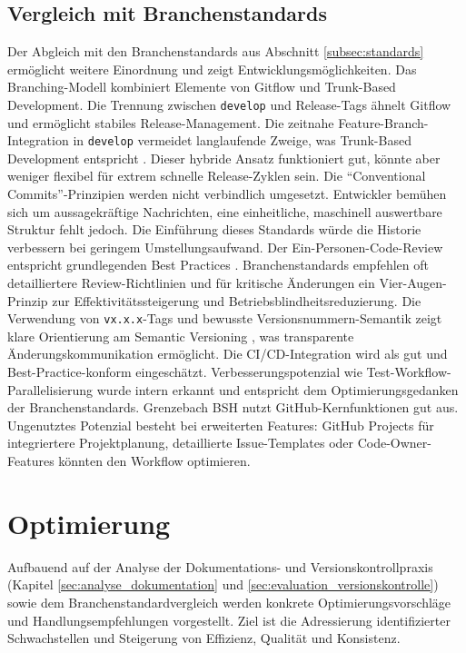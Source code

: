 \documentclass[12pt,oneside]{article}
\begin{document}
    \subsection{Vergleich mit Branchenstandards}
    \label{subsec:vergleich_vk}
    Der Abgleich mit den Branchenstandards aus Abschnitt \ref{subsec:standards} ermöglicht weitere Einordnung und zeigt Entwicklungsmöglichkeiten.
    \newline
    Das Branching-Modell kombiniert Elemente von Gitflow und Trunk-Based Development. Die Trennung zwischen \texttt{develop} und Release-Tags ähnelt Gitflow und ermöglicht stabiles Release-Management. Die zeitnahe Feature-Branch-Integration in \texttt{develop} vermeidet langlaufende Zweige, was Trunk-Based Development entspricht \cite{AtlassianGitWorkflows}. Dieser hybride Ansatz funktioniert gut, könnte aber weniger flexibel für extrem schnelle Release-Zyklen sein.
    \newline
    Die ``Conventional Commits''-Prinzipien \cite{ConventionalCommitsOrgDe} werden nicht verbindlich umgesetzt. Entwickler bemühen sich um aussagekräftige Nachrichten, eine einheitliche, maschinell auswertbare Struktur fehlt jedoch. Die Einführung dieses Standards würde die Historie verbessern bei geringem Umstellungsaufwand.
    \newline
    Der Ein-Personen-Code-Review entspricht grundlegenden Best Practices \cite{AtlassianWasIstEinPullRequest}. Branchenstandards empfehlen oft detailliertere Review-Richtlinien und für kritische Änderungen ein Vier-Augen-Prinzip zur Effektivitätssteigerung und Betriebsblindheitsreduzierung.
    \newline
    Die Verwendung von \texttt{vx.x.x}-Tags und bewusste Versionsnummern-Semantik zeigt klare Orientierung am Semantic Versioning \cite{SemVerOrgDe}, was transparente Änderungskommunikation ermöglicht.
    \newline
    Die CI/CD-Integration wird als gut und Best-Practice-konform eingeschätzt. Verbesserungspotenzial wie Test-Workflow-Parallelisierung wurde intern erkannt und entspricht dem Optimierungsgedanken der Branchenstandards.
    \newline
    Grenzebach BSH nutzt GitHub-Kernfunktionen gut aus. Ungenutztes Potenzial besteht bei erweiterten Features: GitHub Projects für integriertere Projektplanung, detaillierte Issue-Templates oder Code-Owner-Features könnten den Workflow optimieren.



    \section{Optimierung}
    \label{sec:optimierung}
    Aufbauend auf der Analyse der Dokumentations- und Versionskontrollpraxis (Kapitel \ref{sec:analyse_dokumentation} und \ref{sec:evaluation_versionskontrolle}) sowie dem Branchenstandardvergleich werden konkrete Optimierungsvorschläge und Handlungsempfehlungen vorgestellt. Ziel ist die Adressierung identifizierter Schwachstellen und Steigerung von Effizienz, Qualität und Konsistenz.
\end{document}

